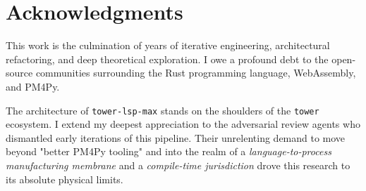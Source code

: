 
\chapter*{Acknowledgments}
This work is the culmination of years of iterative engineering, architectural refactoring, and deep theoretical exploration. I owe a profound debt to the open-source communities surrounding the Rust programming language, WebAssembly, and PM4Py. 

The architecture of \texttt{tower-lsp-max} stands on the shoulders of the \texttt{tower} ecosystem. I extend my deepest appreciation to the adversarial review agents who dismantled early iterations of this pipeline. Their unrelenting demand to move beyond "better PM4Py tooling" and into the realm of a \textit{language-to-process manufacturing membrane} and a \textit{compile-time jurisdiction} drove this research to its absolute physical limits.
